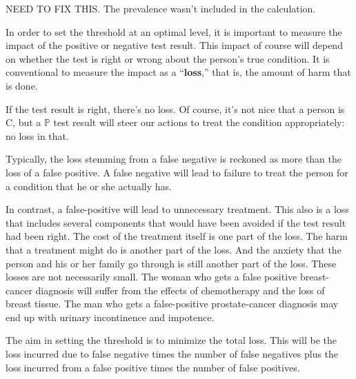 \documentclass[
  letterpaper,
  DIV=11,
  numbers=noendperiod,
  oneside]{scrreprt}
\begin{document}
\begin{tcolorbox}[enhanced jigsaw, colbacktitle=quarto-callout-warning-color!10!white, breakable, opacitybacktitle=0.6, colback=white, left=2mm, arc=.35mm, colframe=quarto-callout-warning-color-frame, coltitle=black, toprule=.15mm, opacityback=0, leftrule=.75mm, bottomtitle=1mm, toptitle=1mm, titlerule=0mm, title=\textcolor{quarto-callout-warning-color}{\faExclamationTriangle}\hspace{0.5em}{In Draft}, rightrule=.15mm, bottomrule=.15mm]

NEED TO FIX THIS. The prevalence wasn't included in the calculation.

\end{tcolorbox}

In order to set the threshold at an optimal level, it is important to
measure the impact of the positive or negative test result. This impact
of course will depend on whether the test is right or wrong about the
person's true condition. It is conventional to measure the impact as a
``\textbf{loss},'' that is, the amount of harm that is done.

If the test result is right, there's no loss. Of course, it's not nice
that a person is C, but a \(\mathbb{P}\) test result will steer our
actions to treat the condition appropriately: no loss in that.

Typically, the loss stemming from a false negative is reckoned as more
than the loss of a false positive. A false negative will lead to failure
to treat the person for a condition that he or she actually has.

In contrast, a false-positive will lead to unnecessary treatment. This
also is a loss that includes several components that would have been
avoided if the test result had been right. The cost of the treatment
itself is one part of the loss. The harm that a treatment might do is
another part of the loss. And the anxiety that the person and his or her
family go through is still another part of the loss. These losses are
not necessarily small. The woman who gets a false positive breast-cancer
diagnosis will suffer from the effects of chemotherapy and the loss of
breast tissue. The man who gets a false-positive prostate-cancer
diagnosis may end up with urinary incontinence and impotence.

The aim in setting the threshold is to minimize the total loss. This
will be the loss incurred due to false negative times the number of
false negatives plus the loss incurred from a false positive times the
number of false positives.
\end{document}
